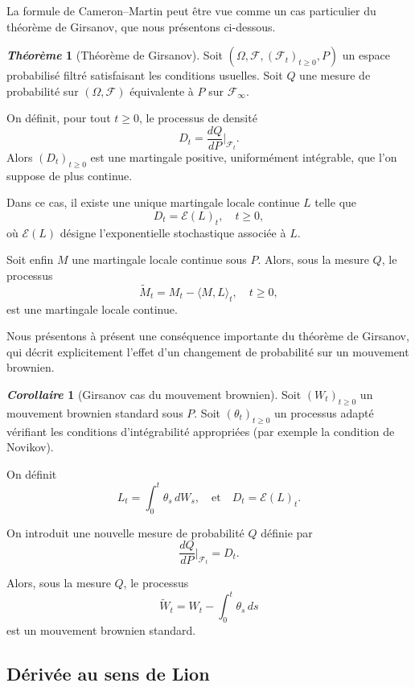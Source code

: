 \documentclass[12pt,a4paper,twoside]{book}%
\theoremstyle{definition}
\newtheorem{thm}[dfn]{\textit{Théorème}}
\newtheorem{cor}[dfn]{\textit{Corollaire}}
\numberwithin{equation}{section}
\begin{document}
La formule de Cameron–Martin peut être vue comme un cas particulier du théorème de Girsanov, que nous présentons ci-dessous.

\begin{thm}[Théorème de Girsanov]
		Soit $(\Omega, \mathcal{F}, (\mathcal{F}_t)_{t \geq 0}, P)$ un espace probabilisé filtré satisfaisant les conditions usuelles. 
		Soit $Q$ une mesure de probabilité sur $(\Omega, \mathcal{F})$ équivalente à $P$ sur $\mathcal{F}_\infty$.
		
		On définit, pour tout $t \geq 0$, le processus de densité
		\[
		D_t = \frac{dQ}{dP}\Big|_{\mathcal{F}_t}.
		\]
		Alors $(D_t)_{t \geq 0}$ est une martingale positive, uniformément intégrable, que l'on suppose de plus continue.
		
		Dans ce cas, il existe une unique martingale locale continue $L$ telle que
		\[
		D_t = \mathcal{E}(L)_t, \quad t \geq 0,
		\]
		où $\mathcal{E}(L)$ désigne l'exponentielle stochastique associée à $L$.
		
		Soit enfin $M$ une martingale locale continue sous $P$. Alors, sous la mesure $Q$, le processus
		\[
		\widetilde{M}_t = M_t - \langle M, L \rangle_t, \quad t \geq 0,
		\]
		est une martingale locale continue.	
\end{thm}
Nous présentons à présent une conséquence importante du théorème de Girsanov, qui décrit explicitement l'effet d'un changement de probabilité sur un mouvement brownien.

\begin{cor}[Girsanov cas du mouvement brownien]
		Soit $(W_t)_{t \geq 0}$ un mouvement brownien standard sous $P$. 
		Soit $(\theta_t)_{t \geq 0}$ un processus adapté vérifiant les conditions d'intégrabilité appropriées (par exemple la condition de Novikov).
		
		On définit
		\[
		L_t = \int_0^t \theta_s \, dW_s,
		\quad \text{et} \quad
		D_t = \mathcal{E}(L)_t.
		\]
		
		On introduit une nouvelle mesure de probabilité $Q$ définie par
		\[
		\frac{dQ}{dP}\Big|_{\mathcal{F}_t} = D_t.
		\]
		
		Alors, sous la mesure $Q$, le processus
		\[
		\widetilde{W}_t = W_t - \int_0^t \theta_s \, ds
		\]
		est un mouvement brownien standard.

\end{cor}

\subsection{Dérivée au sens de Lion}
\end{document}
